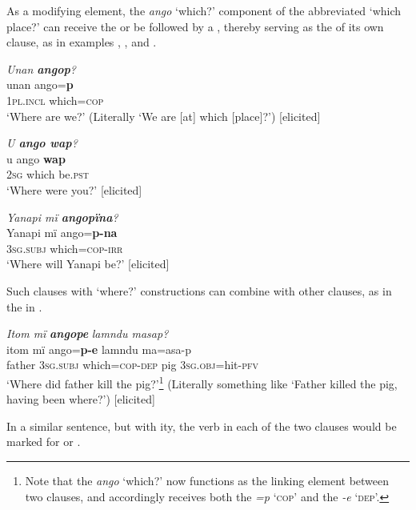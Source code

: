 As a modifying element, the \textit{ango} ‘which?’ component of the abbreviated  ‘which place?’ can receive the  or be followed by a , thereby serving as the  of its own clause, as in examples , , and .

\ea%
    \label{ex:syntax:51}
          \textit{Unan \textbf{angop}?}\\
\gll unan    ango=\textbf{p}\\
    \textsc{1pl.incl}  which=\textsc{cop}\\
\glt `Where are we?’ (Literally ‘We are [at] which [place]?’) [elicited]
\z

\ea%
    \label{ex:syntax:52}
          \textit{U \textbf{ango wap}?}\\
\gll u    ango  \textbf{wap}\\
    \textsc{2sg}  which  be.\textsc{pst}\\
\glt `Where were you?’ [elicited]
\z

\ea%
    \label{ex:syntax:53}
          \textit{Yanapi mï \textbf{angopïna}?}\\
\gll Yanapi  mï      ango=\textbf{p-na}\\
    [name]  \textsc{3sg.subj}  which=\textsc{cop}{}-\textsc{irr}\\
\glt `Where will Yanapi be?’ [elicited]
\z

Such clauses with  ‘where?’ constructions can combine with other clauses, as in the  in .

\ea%
    \label{ex:syntax:54}
          \textit{Itom mï} \textbf{\textit{angope}} \textit{lamndu masap?}\\
\gll    itom  mï      ango=\textbf{p-e}      lamndu  ma=asa-p\\
    father  \textsc{3sg.subj}  which=\textsc{cop-dep}  pig      \textsc{3sg.obj}=hit-\textsc{pfv}\\
\glt `Where did father kill the pig?’\footnote{Note that the  \textit{ango} ‘which?’ now functions as the linking element between two clauses, and accordingly receives both the  \textit{=p} ‘\textsc{cop}’ and the  \textit{-e} ‘\textsc{dep}’.} (Literally something like ‘Father killed the pig, having been where?’) [elicited]
\z

  In a similar sentence, but with  ity, the verb in each of the two clauses would be marked for  or   .

